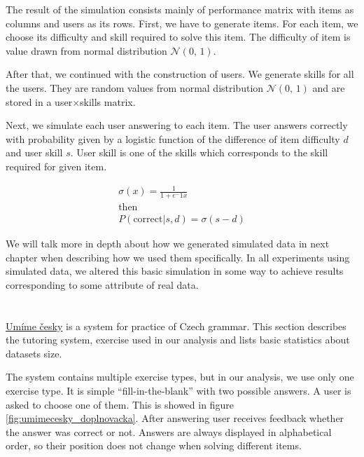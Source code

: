 \documentclass[
  digital, %
  table,   %
  nolof,     %
  nolot,     %
  nocover,
  color,
  final, %
]{fithesis3}
\begin{document}
The result of the simulation consists mainly of performance matrix with items as columns and users as its rows. First, we have to generate items. For each item, we choose its difficulty and skill required to solve this item. The difficulty of item is value drawn from normal distribution $\mathcal{N}(0,\,1)$.

After that, we continued with the construction of users. We generate skills for all the users. They are random values from normal distribution $\mathcal{N}(0,\,1)$ and are stored in a user$\times$skills matrix.

Next, we simulate each user answering to each item. The user answers correctly with probability given by a logistic function of the difference of item difficulty $d$ and user skill $s$. User skill is one of the skills which corresponds to the skill required for given item.

\begin{gather*}
\sigma(x) = \frac{1}{1 + e^-1x} \\
\text{then}\\
P(\text{correct}|s, d) = \sigma(s - d)
\end{gather*}


We will talk more in depth about how we generated simulated data in next chapter when describing how we used them specifically. In all experiments using simulated data, we altered this basic simulation in some way to achieve results corresponding to some attribute of real data.


\section{\umimeCesky{}}\label{umime-cesky}


\href{https://umimecesky.cz/}{Umíme česky} is a system for practice of Czech grammar. This section describes the tutoring system, exercise used in our analysis and lists basic statistics about datasets size.

The system contains multiple exercise types, but in our analysis, we use only one exercise type. It is simple ``fill-in-the-blank'' with two possible answers. A user is asked to choose one of them. This is showed in figure \ref{fig:umimecesky_doplnovacka}. After answering user receives feedback whether the answer was correct or not. Answers are always displayed in alphabetical order, so their position does not change when solving different items.
\end{document}
